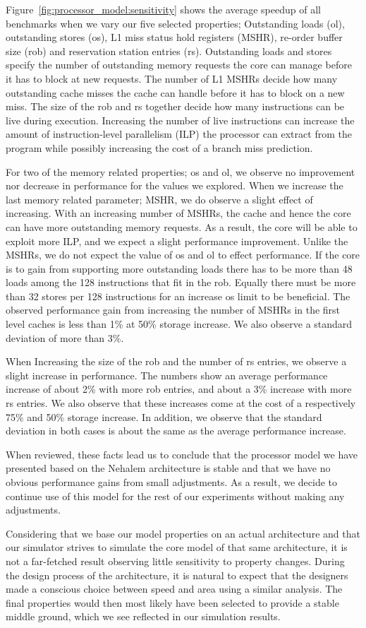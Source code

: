 Figure~\ref{fig:processor_model:sensitivity} shows the average speedup of all benchmarks when we vary our five selected properties; Outstanding loads (ol), outstanding stores (os), L1 miss status hold registers (MSHR), re-order buffer size (rob) and reservation station entries (rs).
Outstanding loads and stores specify the number of outstanding memory requests the core can manage before it has to block at new requests.
The number of L1 MSHRs decide how many outstanding cache misses the cache can handle before it has to block on a new miss.
The size of the rob and rs together decide how many instructions can be live during execution.  
Increasing the number of live instructions can increase the amount of instruction-level parallelism (ILP) the processor can extract from the program while possibly increasing the cost of a branch miss prediction.

For two of the memory related properties; os and ol, we observe no improvement nor decrease in performance for the values we explored.
When we increase the last memory related parameter; MSHR, we do observe a slight effect of increasing. 
With an increasing number of MSHRs, the cache and hence the core can have more outstanding memory requests. 
As a result, the core will be able to exploit more ILP, and we expect a slight performance improvement. 
Unlike the MSHRs, we do not expect the value of os and ol to effect performance. 
If the core is to gain from supporting more outstanding loads there has to be more than 48 loads among the 128 instructions that fit in the rob. 
Equally there must be more than 32 stores per 128 instructions for an increase os limit to be beneficial.
The observed performance gain from increasing the number of MSHRs in the first level caches is less than 1\% at 50\% storage increase. 
We also observe a standard deviation of more than 3\%. 

When Increasing the size of the rob and the number of rs entries, we observe a slight increase in performance.
The numbers show an average performance increase of about 2\% with more rob entries, and about a 3\% increase with more rs entries.
We also observe that these increases come at the cost of a respectively 75\% and 50\% storage increase.
In addition, we observe that the standard deviation in both cases is about the same as the average performance increase.

When reviewed, these facts lead us to conclude that the processor model we have presented based on the Nehalem architecture is stable and that we have no obvious performance gains from small adjustments.
As a result, we decide to continue use of this model for the rest of our experiments without making any adjustments.

Considering that we base our model properties on an actual architecture and that our simulator strives to simulate the core model of that same architecture, it is not a far-fetched result observing little sensitivity to property changes.
During the design process of the architecture, it is natural to expect that the designers made a conscious choice between speed and area using a similar analysis.
The final properties would then most likely have been selected to provide a stable middle ground, which we see reflected in our simulation results.
